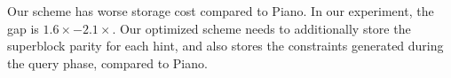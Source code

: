 Our scheme has worse storage cost compared to Piano.
In our experiment, the gap is $1.6\times-2.1\times$.
Our optimized scheme needs to additionally store the superblock parity for each hint, and also stores the constraints generated during the query phase, compared to Piano.